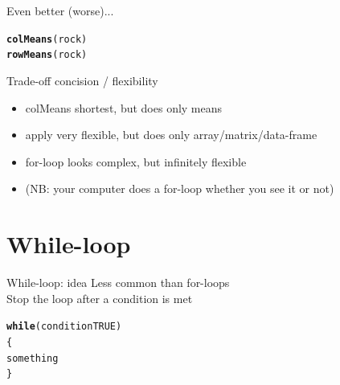 \documentclass[10pt]{beamer}\usepackage[]{graphicx}\usepackage[]{color}
\makeatletter
\newcommand{\hlstd}[1]{\textcolor[rgb]{0.345,0.345,0.345}{#1}}%
\newcommand{\hlkwd}[1]{\textcolor[rgb]{0.737,0.353,0.396}{\textbf{#1}}}%
\newenvironment{kframe}{%
 \def\at@end@of@kframe{}%
 \ifinner\ifhmode%
  \def\at@end@of@kframe{\end{minipage}}%
  \begin{minipage}{\columnwidth}%
 \fi\fi%
 \def\FrameCommand##1{\hskip\@totalleftmargin \hskip-\fboxsep
 \colorbox{shadecolor}{##1}\hskip-\fboxsep
     \hskip-\linewidth \hskip-\@totalleftmargin \hskip\columnwidth}%
 \MakeFramed {\advance\hsize-\width
   \@totalleftmargin\z@ \linewidth\hsize
   \@setminipage}}%
 {\par\unskip\endMakeFramed%
 \at@end@of@kframe}
\newenvironment{knitrout}{}{} %
\makeatother
\begin{document}
\begin{frame}[fragile]{Even better (worse)...}

\begin{knitrout}
\color{fgcolor}\begin{kframe}
\begin{alltt}
  \hlkwd{colMeans}\hlstd{(rock)}
  \hlkwd{rowMeans}\hlstd{(rock)}
\end{alltt}
\end{kframe}
\end{knitrout}

  \pause

  \begin{alertblock}{Trade-off concision  / flexibility}
    \begin{itemize}
      \item colMeans shortest, but does only means
      \item apply very flexible, but does only array/matrix/data-frame
      \item for-loop looks complex, but infinitely flexible
      \item (NB: your computer does a for-loop whether you see it or not)
    \end{itemize}
  \end{alertblock}

\end{frame}

\section{While-loop}

\begin{frame}[fragile]{While-loop: idea}
Less common than for-loops\\
Stop the loop after a condition is met\\

\begin{knitrout}
\color{fgcolor}\begin{kframe}
\begin{alltt}
    \hlkwd{while}(condition TRUE)
    \{
      something
    \}
\end{alltt}
\end{kframe}
\end{knitrout}
  
\end{frame}
\end{document}
